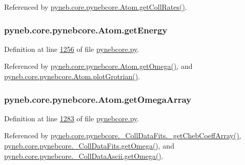 Referenced by \hyperlink{pynebcore_8py_source_l01394}{pyneb.\-core.\-pynebcore.\-Atom.\-get\-Coll\-Rates()}.

\hypertarget{classpyneb_1_1core_1_1pynebcore_1_1_atom_a9940acb2999e864edf9761d822e65d7f}{
\subsubsection[{get\-Energy}]{\setlength{\rightskip}{0pt plus 5cm}pyneb.\-core.\-pynebcore.\-Atom.\-get\-Energy}}\label{classpyneb_1_1core_1_1pynebcore_1_1_atom_a9940acb2999e864edf9761d822e65d7f}


Definition at line \hyperlink{pynebcore_8py_source_l01256}{1256} of file \hyperlink{pynebcore_8py_source}{pynebcore.\-py}.



Referenced by \hyperlink{pynebcore_8py_source_l01324}{pyneb.\-core.\-pynebcore.\-Atom.\-get\-Omega()}, and \hyperlink{pynebcore_8py_source_l02443}{pyneb.\-core.\-pynebcore.\-Atom.\-plot\-Grotrian()}.

\hypertarget{classpyneb_1_1core_1_1pynebcore_1_1_atom_a82067d384b463179a274711b618f03b5}{
\subsubsection[{get\-Omega\-Array}]{\setlength{\rightskip}{0pt plus 5cm}pyneb.\-core.\-pynebcore.\-Atom.\-get\-Omega\-Array}}\label{classpyneb_1_1core_1_1pynebcore_1_1_atom_a82067d384b463179a274711b618f03b5}


Definition at line \hyperlink{pynebcore_8py_source_l01283}{1283} of file \hyperlink{pynebcore_8py_source}{pynebcore.\-py}.



Referenced by \hyperlink{pynebcore_8py_source_l00751}{pyneb.\-core.\-pynebcore.\-\_\-\-Coll\-Data\-Fits.\-\_\-get\-Cheb\-Coeff\-Array()}, \hyperlink{pynebcore_8py_source_l00828}{pyneb.\-core.\-pynebcore.\-\_\-\-Coll\-Data\-Fits.\-get\-Omega()}, and \hyperlink{pynebcore_8py_source_l01082}{pyneb.\-core.\-pynebcore.\-\_\-\-Coll\-Data\-Ascii.\-get\-Omega()}.

